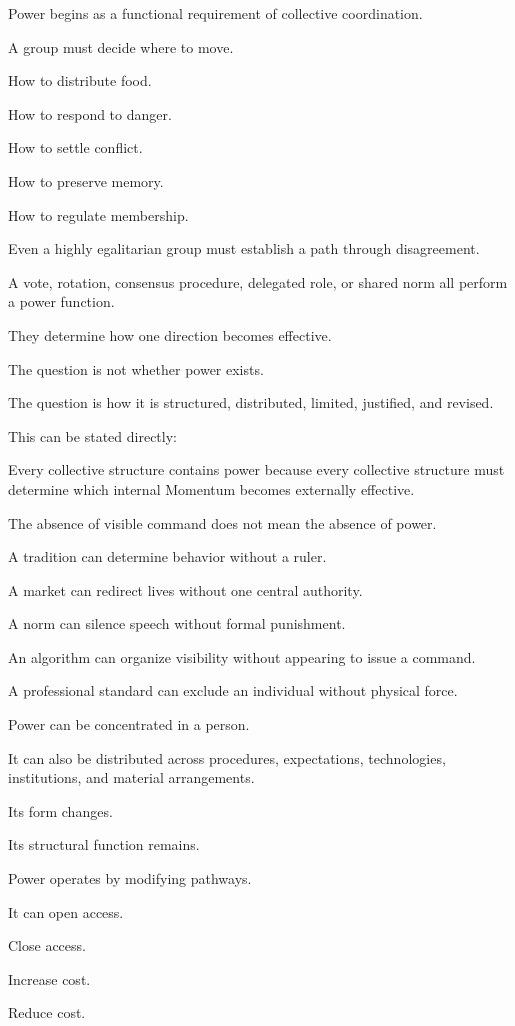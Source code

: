Power begins as a functional requirement of collective coordination.

A group must decide where to move.

How to distribute food.

How to respond to danger.

How to settle conflict.

How to preserve memory.

How to regulate membership.

Even a highly egalitarian group must establish a path through disagreement.

A vote, rotation, consensus procedure, delegated role, or shared norm all perform a power function.

They determine how one direction becomes effective.

The question is not whether power exists.

The question is how it is structured, distributed, limited, justified, and revised.

This can be stated directly:

Every collective structure contains power because every collective structure must determine which internal Momentum becomes externally effective.

The absence of visible command does not mean the absence of power.

A tradition can determine behavior without a ruler.

A market can redirect lives without one central authority.

A norm can silence speech without formal punishment.

An algorithm can organize visibility without appearing to issue a command.

A professional standard can exclude an individual without physical force.

Power can be concentrated in a person.

It can also be distributed across procedures, expectations, technologies, institutions, and material arrangements.

Its form changes.

Its structural function remains.

Power operates by modifying pathways.

It can open access.

Close access.

Increase cost.

Reduce cost.

